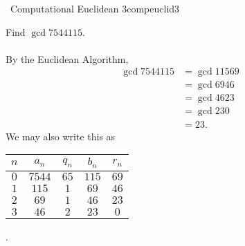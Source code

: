     \begin{exercise}{\Difficulty\,\Difficulty\,\,Computational Euclidean 3}{compeuclid3}
    
        Find \(\gcd{7544}{115}\).
        \\
        \\
        By the Euclidean Algorithm,
        \begin{align*}
            \gcd{7544}{115}&=\gcd{115}{69} \\
            &=\gcd{69}{46} \\
            &=\gcd{46}{23} \\
            &=\gcd{23}{0} \\
            &=23.
        \end{align*}
        We may also write this as
        \begin{center}
            \begin{tabular}{c|c|c|c|c}
                \hline
                \(n\) & \(a_n\) & \(q_n\) & \(b_n\) & \(r_n\) \\
                \hline
                \(0\) & \(7544\) & \(65\) & \(115\) & \(69\) \\
                \(1\) & \(115\) & \(1\) & \(69\) & \(46\) \\
                \(2\) & \(69\) & \(1\) & \(46\) & \(23\) \\
                \(3\) & \(46\) & \(2\) & \(23\) & \(0\) \\
                \hline
            \end{tabular}.
        \end{center}
    
    \end{exercise}
